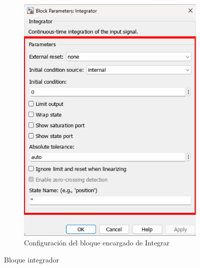 \begin{figure}[htbp]
\begin{subfigure}[b]{0.45\textwidth}
        \includegraphics[width=\textwidth]{fig/Capitulo5/Caso_de_estudio_PID/config_integrator.pdf}
        \caption{Configuración del bloque encargado de Integrar}
        \label{fig:int_conf_PID}
    \end{subfigure}
    \caption{Bloque integrador}
    \label{fig:int_block}
\end{figure}

